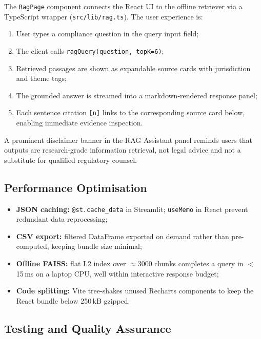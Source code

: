 The \texttt{RagPage} component connects the React UI to the offline retriever via a
TypeScript wrapper (\texttt{src/lib/rag.ts}). The user experience is:

\begin{enumerate}[noitemsep]
  \item User types a compliance question in the query input field;
  \item The client calls \texttt{ragQuery(question, topK=6)};
  \item Retrieved passages are shown as expandable source cards with jurisdiction
        and theme tags;
  \item The grounded answer is streamed into a markdown-rendered response panel;
  \item Each sentence citation \texttt{[n]} links to the corresponding source card
        below, enabling immediate evidence inspection.
\end{enumerate}

A prominent disclaimer banner in the RAG Assistant panel reminds users that outputs
are research-grade information retrieval, not legal advice and not a substitute for
qualified regulatory counsel.

\subsection{Performance Optimisation}
\label{sec:dash-perf}

\begin{itemize}[noitemsep]
  \item \textbf{JSON caching:} \texttt{@st.cache\_data} in Streamlit; \texttt{useMemo}
        in React prevent redundant data reprocessing;
  \item \textbf{CSV export:} filtered DataFrame exported on demand rather than
        pre-computed, keeping bundle size minimal;
  \item \textbf{Offline FAISS:} flat L2 index over $\approx$3000 chunks completes a
        query in $<$15\,ms on a laptop CPU, well within interactive response budget;
  \item \textbf{Code splitting:} Vite tree-shakes unused Recharts components to keep
        the React bundle below 250\,kB gzipped.
\end{itemize}

\subsection{Testing and Quality Assurance}
\label{sec:dash-test}

